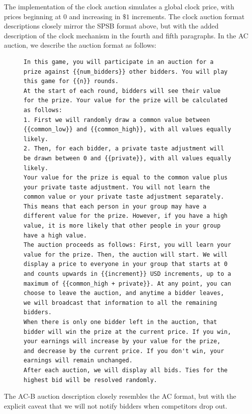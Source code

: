 \documentclass{article} %
\begin{document}
The implementation of the clock auction simulates a global clock price, with prices beginning at $0$ and increasing in $\$1$ increments. The clock auction format descriptions closely mirror the SPSB format above, but with the added description of the clock mechanism in the fourth and fifth paragraphs.
In the AC auction, we describe the auction format as follows:
\begin{figure}
\centering
\begin{minipage}{0.95\textwidth}
\begin{lstlisting}
In this game, you will participate in an auction for a prize against {{num_bidders}} other bidders. You will play this game for {{n}} rounds.
At the start of each round, bidders will see their value for the prize. Your value for the prize will be calculated as follows:
1. First we will randomly draw a common value between {{common_low}} and {{common_high}}, with all values equally likely.
2. Then, for each bidder, a private taste adjustment will be drawn between 0 and {{private}}, with all values equally likely.
Your value for the prize is equal to the common value plus your private taste adjustment. You will not learn the common value or your private taste adjustment separately. This means that each person in your group may have a different value for the prize. However, if you have a high value, it is more likely that other people in your group have a high value.
The auction proceeds as follows: First, you will learn your value for the prize. Then, the auction will start. We will display a price to everyone in your group that starts at 0 and counts upwards in {{increment}} USD increments, up to a maximum of {{common_high + private}}. At any point, you can choose to leave the auction, and anytime a bidder leaves, we will broadcast that information to all the remaining bidders.
When there is only one bidder left in the auction, that bidder will win the prize at the current price. If you win, your earnings will increase by your value for the prize, and decrease by the current price. If you don't win, your earnings will remain unchanged.
After each auction, we will display all bids. Ties for the highest bid will be resolved randomly.
\end{lstlisting}
\end{minipage}
\label{fig:sealbid_prompt-5}
\end{figure}

The AC-B auction description closely resembles the AC format, but with the explicit caveat that we will not notify bidders when competitors drop out.
\end{document}
